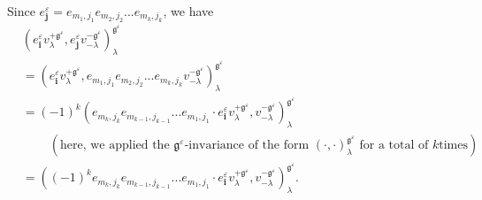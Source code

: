 \documentclass
[numbers=enddot,12pt,final,onecolumn,german,notitlepage]{scrartcl}%
\theoremstyle{definition}
\begin{document}
Since $e_{\mathbf{j}}^{\varepsilon}=e_{m_{1},j_{1}}e_{m_{2},j_{2}}%
...e_{m_{k},j_{k}}$, we have%
\begin{align}
&  \left(  e_{\mathbf{i}}^{\varepsilon}v_{\lambda}^{+\mathfrak{g}%
^{\varepsilon}},e_{\mathbf{j}}^{\varepsilon}v_{-\lambda}^{-\mathfrak{g}%
^{\varepsilon}}\right)  _{\lambda}^{\mathfrak{g}^{\varepsilon}}\nonumber\\
&  =\left(  e_{\mathbf{i}}^{\varepsilon}v_{\lambda}^{+\mathfrak{g}%
^{\varepsilon}},e_{m_{1},j_{1}}e_{m_{2},j_{2}}...e_{m_{k},j_{k}}v_{-\lambda
}^{-\mathfrak{g}^{\varepsilon}}\right)  _{\lambda}^{\mathfrak{g}^{\varepsilon
}}\nonumber\\
&  =\left(  -1\right)  ^{k}\left(  e_{m_{k},j_{k}}e_{m_{k-1},j_{k-1}%
}...e_{m_{1},j_{1}}\cdot e_{\mathbf{i}}^{\varepsilon}v_{\lambda}%
^{+\mathfrak{g}^{\varepsilon}},v_{-\lambda}^{-\mathfrak{g}^{\varepsilon}%
}\right)  _{\lambda}^{\mathfrak{g}^{\varepsilon}}\nonumber\\
&  \ \ \ \ \ \ \ \ \ \ \left(  \text{here, we applied the }\mathfrak{g}%
^{\varepsilon}\text{-invariance of the form }\left(  \cdot,\cdot\right)
_{\lambda}^{\mathfrak{g}^{\varepsilon}}\text{ for a total of }k\text{
times}\right) \nonumber\\
&  =\left(  \left(  -1\right)  ^{k}e_{m_{k},j_{k}}e_{m_{k-1},j_{k-1}%
}...e_{m_{1},j_{1}}\cdot e_{\mathbf{i}}^{\varepsilon}v_{\lambda}%
^{+\mathfrak{g}^{\varepsilon}},v_{-\lambda}^{-\mathfrak{g}^{\varepsilon}%
}\right)  _{\lambda}^{\mathfrak{g}^{\varepsilon}}.
\label{pf.invformnondeg.polynomiality.1}%
\end{align}
\end{document}
